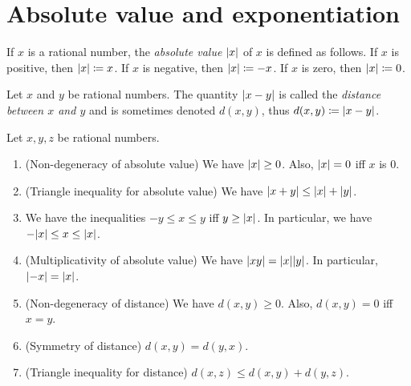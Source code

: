 \section{Absolute value and exponentiation}\label{i:sec:4.3}

\begin{defn}\label{i:4.3.1}
  If \(x\) is a rational number, the \emph{absolute value} \(\left\lvert x\right\rvert\) of \(x\) is defined as follows.
  If \(x\) is positive, then \(\left\lvert x\right\rvert \coloneqq x\).
  If \(x\) is negative, then \(\left\lvert x\right\rvert \coloneqq -x\).
  If \(x\) is zero, then \(\left\lvert x\right\rvert \coloneqq 0\).
\end{defn}

\begin{defn}[Distance]\label{i:4.3.2}
  Let \(x\) and \(y\) be rational numbers.
  The quantity \(\left\lvert x - y\right\rvert\) is called the \emph{distance between \(x\) and \(y\)} and is sometimes denoted \(d(x, y)\), thus \(d(x, y) \coloneqq \left\lvert x - y\right\rvert\).
\end{defn}

\begin{prop}\label{i:4.3.3}
  Let \(x, y, z\) be rational numbers.
  \begin{enumerate}
    \item\label{i:4.3.3.a} (Non-degeneracy of absolute value)
    We have \(\left\lvert x\right\rvert \geq 0\).
    Also, \(\left\lvert x\right\rvert = 0\) iff \(x\) is \(0\).
    \item\label{i:4.3.3.b} (Triangle inequality for absolute value)
    We have \(\left\lvert x + y\right\rvert \leq \left\lvert x\right\rvert + \left\lvert y\right\rvert\).
    \item\label{i:4.3.3.c} We have the inequalities \(-y \leq x \leq y\) iff \(y \geq \left\lvert x\right\rvert\).
    In particular, we have \(-\abs{x} \leq x \leq \abs{x}\).
    \item\label{i:4.3.3.d} (Multiplicativity of absolute value)
    We have \(\abs{xy} = \abs{x} \abs{y}\).
    In particular, \(\left\lvert-x\right\rvert = \left\lvert x\right\rvert\).
    \item\label{i:4.3.3.e} (Non-degeneracy of distance)
    We have \(d(x, y) \geq 0\).
    Also, \(d(x, y) = 0\) iff \(x = y\).
    \item\label{i:4.3.3.f} (Symmetry of distance)
    \(d(x, y) = d(y, x)\).
    \item\label{i:4.3.3.g} (Triangle inequality for distance)
    \(d(x, z) \leq d(x, y) + d(y, z)\).
  \end{enumerate}
\end{prop}

